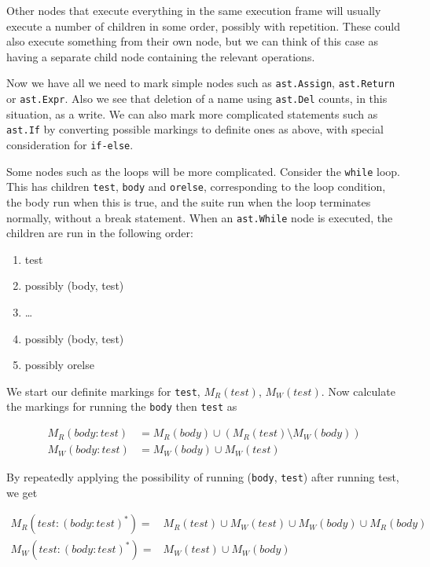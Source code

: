 \documentclass[twoside,a4paper]{report}
\begin{document}
Other nodes that execute everything in the same execution frame will usually execute a number of children in some order, possibly
with repetition. These could also execute something from their own node, but we can think of this case as having a separate child node containing
the relevant operations.

Now we have all we need to mark simple nodes such as \texttt{ast.Assign}, \texttt{ast.Return} or \texttt{ast.Expr}. Also we see that deletion of a name
using \texttt{ast.Del} counts, in this situation, as a write. We can also mark more complicated statements such as \texttt{ast.If} by converting
possible markings to definite ones as above, with special consideration for \texttt{if-else}.

Some nodes such as the loops will be more complicated. Consider the \texttt{while} loop. This has children \texttt{test}, \texttt{body} and \texttt{orelse},
corresponding to the loop condition, the body run when this is true, and the suite run when the loop terminates normally, without a break statement. When
an \texttt{ast.While} node is executed, the children are run in the following order:

\begin{enumerate}
\item test
\item possibly (body, test)
\item \ldots
\item possibly (body, test)
\item possibly orelse
\end{enumerate}

We start our definite markings for \texttt{test}, $M_R(test)$, $M_W(test)$. Now calculate the markings for running the \texttt{body} then \texttt{test} as

\begin{align*}
M_R(body : test) &= M_R(body) \cup (M_R(test) \setminus M_W(body)) \\
M_W(body : test) &= M_W(body) \cup M_W(test)
\end{align*}

By repeatedly applying the possibility of running (\texttt{body}, \texttt{test}) after running test, we get

\begin{align*}
M_R(test : (body : test)^*) =& M_R(test) \cup M_W(test) \cup M_W(body) \cup M_R(body) \\
M_W(test : (body : test)^*) =& M_W(test) \cup M_W(body)
\end{align*}
\end{document}
